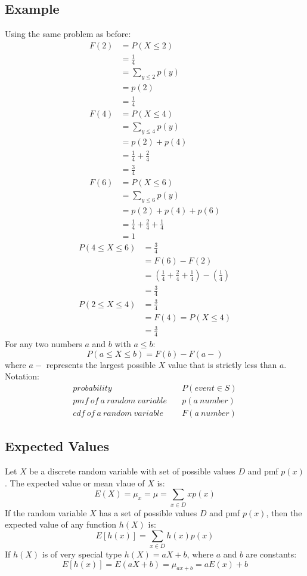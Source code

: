 \documentclass[letterpaper, 12pt]{math}
\begin{document}
\subsection*{Example}
Using the same problem as before:
\begin{align*}
  F(2) &= P(X\leq 2) \\
  &= \frac{1}{4} \\
  &= \sum_{y\leq 2}p(y) \\
  &= p(2) \\
  &= \frac{1}{4} \\
  F(4) &= P(X\leq 4) \\
  &= \sum_{y\leq 4}p(y) \\
  &= p(2)+p(4) \\
  &= \frac{1}{4}+\frac{2}{4} \\
  &= \frac{3}{4} \\
  F(6) &= P(X\leq 6) \\
  &= \sum_{y\leq 6}p(y) \\
  &= p(2)+p(4)+p(6) \\
  &= \frac{1}{4}+\frac{2}{4}+\frac{1}{4} \\
  &= 1
\end{align*}
\begin{align*}
  P(4\leq X\leq 6) &= \frac{3}{4} \\
  &= F(6)-F(2) \\
  &= (\frac{1}{4}+\frac{2}{4}+\frac{1}{4})-(\frac{1}{4}) \\
  &= \frac{3}{4} \\
  P(2\leq X\leq 4) &= \frac{3}{4} \\
  &= F(4) = P(X\leq 4) \\
  &= \frac{3}{4}
\end{align*}
For any two numbers \( a \) and \( b \) with \( a \leq b \):
\[ P(a\leq X\leq b) = F(b)-F(a-) \]
where \( a- \) represents the largest possible \( X \) value that is strictly
less than \( a \). Notation:
\begin{align*}
  probability \quad & P(event\in S) \\
  pmf\ of\ a\ random\ variable \quad & p(a\ number) \\
  cdf\ of\ a\ random\ variable \quad & F(a\ number)
\end{align*}

\subsection*{Expected Values}
Let \( X \) be a discrete random variable with set of possible values \( D \)
and pmf \( p(x) \). The expected value or mean vlaue of \( X \) is:
\[ E(X) = \mu_{x} = \mu = \sum_{x\in D}xp(x) \]
If the random variable \( X \) has a set of possible values \( D \) and
pmf \( p(x) \), then the expected value of any function \( h(X) \) is:
\[ E[h(x)] = \sum_{x\in D}h(x)p(x) \]
If \( h(X) \) is of very special type \( h(X) = aX+b \), where \( a \) and
\( b \) are constants:
\[ E[h(x)] = E(aX+b) = \mu_{ax+b} = aE(x)+b \]
\end{document}

